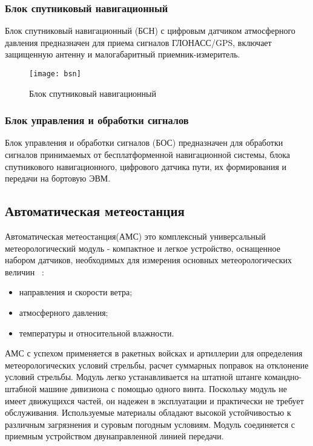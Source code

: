 \subsubsection{Блок спутниковый навигационный}
\label{sub:lit_review:ins:bsn}
Блок спутниковый навигационный (БСН) с цифровым датчиком атмосферного давления предназначен для приема сигналов ГЛОНАСС/GPS, включает защищенную антенну и малогабаритный приемник-измеритель.
\begin{figure}
	\centering
	\texttt{[image: bsn]}
	\caption{Блок спутниковый навигационный~\cite{bsn}}
	\label{fig:lit_reiview:ins:bsn}
\end{figure}

\subsubsection{Блок управления и обработки сигналов}
\label{sub:lit_review:ins:bos}
Блок управления и обработки сигналов (БОС) предназначен для обработки сигналов принимаемых от бесплатформенной
навигационной системы, блока спутникового навигационного, цифрового датчика пути, их
формирования и передачи на бортовую ЭВМ.

\subsection{Автоматическая метеостанция}
\label{sub:lit_review:meteo}

Автоматическая метеостанция(АМС) это комплексный универсальный метеорологический модуль - компактное и легкое
устройство, оснащенное набором датчиков, необходимых для измерения основных метеорологических величин ~\cite{wxt530}:
\begin{itemize}
	\item направления и скорости ветра;
	\item атмосферного давления;
	\item температуры и относительной влажности.
\end{itemize}

АМС с успехом применяется в ракетных войсках и артиллерии для определения метеорологических условий стрельбы, расчет суммарных поправок на отклонение условий стрельбы.
Модуль легко устанавливается на штатной штанге командно-штабной машине дивизиона с помощью одного винта.
Поскольку модуль не имеет движущихся частей, он надежен в эксплуатации и практически не требует обслуживания.
Используемые материалы обладают высокой устойчивостью к различным загрязнения и суровым погодным условиям.
Модуль соединяется с приемным устройством двунаправленной линией передачи.

